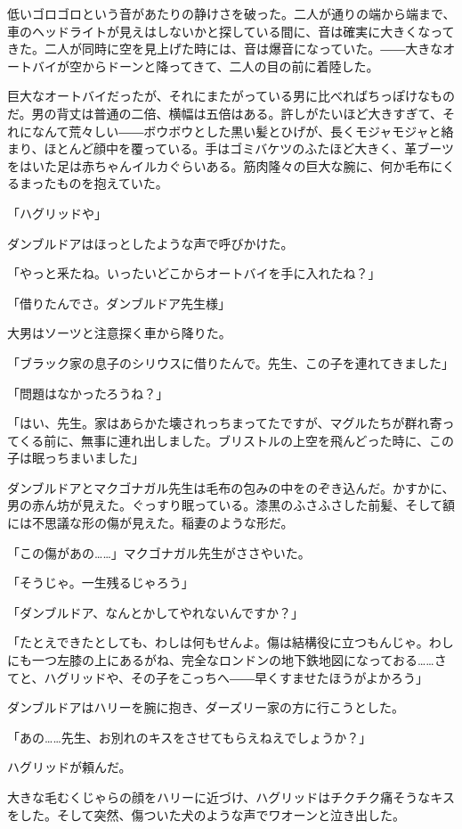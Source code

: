 \documentclass[10pt,a4paper]{article}
\begin{document}
\begin{CJK}{UTF8}{min}
低いゴロゴロという音があたりの静けさを破った。二人が通りの端から端まで、車のヘッドライトが見えはしないかと探している間に、音は確実に大きくなってきた。二人が同時に空を見上げた時には、音は爆音になっていた。――大きなオートバイが空からドーンと降ってきて、二人の目の前に着陸した。

巨大なオートバイだったが、それにまたがっている男に比べればちっぽけなものだ。男の背丈は普通の二倍、横幅は五倍はある。許しがたいほど大きすぎて、それになんて荒々しい――ボウボウとした黒い髪とひげが、長くモジャモジャと絡まり、ほとんど顔中を覆っている。手はゴミバケツのふたほど大きく、革ブーツをはいた足は赤ちゃんイルカぐらいある。筋肉隆々の巨大な腕に、何か毛布にくるまったものを抱えていた。

「ハグリッドや」

ダンブルドアはほっとしたような声で呼びかけた。

「やっと釆たね。いったいどこからオートバイを手に入れたね？」

「借りたんでさ。ダンブルドア先生様」

大男はソーツと注意探く車から降りた。

「ブラック家の息子のシリウスに借りたんで。先生、この子を連れてきました」

「問題はなかったろうね？」

「はい、先生。家はあらかた壊されっちまってたですが、マグルたちが群れ寄ってくる前に、無事に連れ出しました。ブリストルの上空を飛んどった時に、この子は眠っちまいました」

ダンブルドアとマクゴナガル先生は毛布の包みの中をのぞき込んだ。かすかに、男の赤ん坊が見えた。ぐっすり眠っている。漆黒のふさふさした前髪、そして額には不思議な形の傷が見えた。稲妻のような形だ。

「この傷があの……」マクゴナガル先生がささやいた。

「そうじゃ。一生残るじゃろう」

「ダンブルドア、なんとかしてやれないんですか？」

「たとえできたとしても、わしは何もせんよ。傷は結構役に立つもんじゃ。わしにも一つ左膝の上にあるがね、完全なロンドンの地下鉄地図になっておる……さてと、ハグリッドや、その子をこっちへ――早くすませたほうがよかろう」

ダンブルドアはハリーを腕に抱き、ダーズリー家の方に行こうとした。

「あの……先生、お別れのキスをさせてもらえねえでしょうか？」

ハグリッドが頼んだ。

大きな毛むくじゃらの顔をハリーに近づけ、ハグリッドはチクチク痛そうなキスをした。そして突然、傷ついた犬のような声でワオーンと泣き出した。


\end{CJK}
\end{document}
